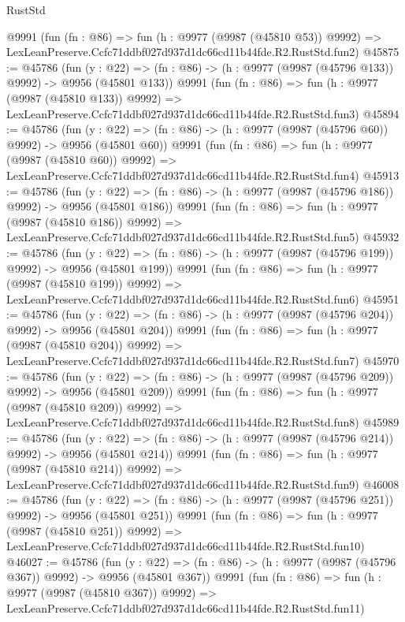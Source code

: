 \begin{lexlean}{RustStd}
\begin{coremodule}
    @9991
    (fun (fn : @86) =>
    fun (h : @9977 (@9987 (@45810 @53)) @9992) =>
    LexLeanPreserve.Ccfc71ddbf027d937d1dc66cd11b44fde.R2.RustStd.fun2)
@45875 := @45786
    (fun (y : @22) => (fn : @86) -> (h : @9977 (@9987 (@45796 @133)) @9992) -> @9956 (@45801 @133))
    @9991
    (fun (fn : @86) =>
    fun (h : @9977 (@9987 (@45810 @133)) @9992) =>
    LexLeanPreserve.Ccfc71ddbf027d937d1dc66cd11b44fde.R2.RustStd.fun3)
@45894 := @45786
    (fun (y : @22) => (fn : @86) -> (h : @9977 (@9987 (@45796 @60)) @9992) -> @9956 (@45801 @60))
    @9991
    (fun (fn : @86) =>
    fun (h : @9977 (@9987 (@45810 @60)) @9992) =>
    LexLeanPreserve.Ccfc71ddbf027d937d1dc66cd11b44fde.R2.RustStd.fun4)
@45913 := @45786
    (fun (y : @22) => (fn : @86) -> (h : @9977 (@9987 (@45796 @186)) @9992) -> @9956 (@45801 @186))
    @9991
    (fun (fn : @86) =>
    fun (h : @9977 (@9987 (@45810 @186)) @9992) =>
    LexLeanPreserve.Ccfc71ddbf027d937d1dc66cd11b44fde.R2.RustStd.fun5)
@45932 := @45786
    (fun (y : @22) => (fn : @86) -> (h : @9977 (@9987 (@45796 @199)) @9992) -> @9956 (@45801 @199))
    @9991
    (fun (fn : @86) =>
    fun (h : @9977 (@9987 (@45810 @199)) @9992) =>
    LexLeanPreserve.Ccfc71ddbf027d937d1dc66cd11b44fde.R2.RustStd.fun6)
@45951 := @45786
    (fun (y : @22) => (fn : @86) -> (h : @9977 (@9987 (@45796 @204)) @9992) -> @9956 (@45801 @204))
    @9991
    (fun (fn : @86) =>
    fun (h : @9977 (@9987 (@45810 @204)) @9992) =>
    LexLeanPreserve.Ccfc71ddbf027d937d1dc66cd11b44fde.R2.RustStd.fun7)
@45970 := @45786
    (fun (y : @22) => (fn : @86) -> (h : @9977 (@9987 (@45796 @209)) @9992) -> @9956 (@45801 @209))
    @9991
    (fun (fn : @86) =>
    fun (h : @9977 (@9987 (@45810 @209)) @9992) =>
    LexLeanPreserve.Ccfc71ddbf027d937d1dc66cd11b44fde.R2.RustStd.fun8)
@45989 := @45786
    (fun (y : @22) => (fn : @86) -> (h : @9977 (@9987 (@45796 @214)) @9992) -> @9956 (@45801 @214))
    @9991
    (fun (fn : @86) =>
    fun (h : @9977 (@9987 (@45810 @214)) @9992) =>
    LexLeanPreserve.Ccfc71ddbf027d937d1dc66cd11b44fde.R2.RustStd.fun9)
@46008 := @45786
    (fun (y : @22) => (fn : @86) -> (h : @9977 (@9987 (@45796 @251)) @9992) -> @9956 (@45801 @251))
    @9991
    (fun (fn : @86) =>
    fun (h : @9977 (@9987 (@45810 @251)) @9992) =>
    LexLeanPreserve.Ccfc71ddbf027d937d1dc66cd11b44fde.R2.RustStd.fun10)
@46027 := @45786
    (fun (y : @22) => (fn : @86) -> (h : @9977 (@9987 (@45796 @367)) @9992) -> @9956 (@45801 @367))
    @9991
    (fun (fn : @86) =>
    fun (h : @9977 (@9987 (@45810 @367)) @9992) =>
    LexLeanPreserve.Ccfc71ddbf027d937d1dc66cd11b44fde.R2.RustStd.fun11)

\end{coremodule}
\end{lexlean}
